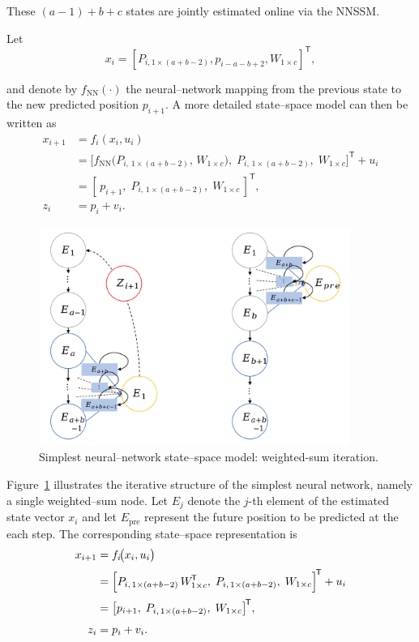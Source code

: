 \documentclass[sn-nature]{sn-jnl}%
\theoremstyle{thmstyleone}%
\theoremstyle{thmstyletwo}%
\theoremstyle{thmstylethree}%
\begin{document}
These \((a-1)+b+c\) states are jointly estimated online via the NNSSM.

Let
\noindent
\begin{equation}
{x_i} = {[P_{i,1 \times (a+b-2)},{p_{i-a-b+2}},{W_{1 \times c}}]^{\!\mathsf T}},
\label{3_3}
\end{equation}

and denote by \(f_{\mathrm{NN}}(\cdot)\) the neural–network mapping from the previous state to the new predicted position \(p_{i+1}\).  A more detailed state–space model can then be written as
\noindent
\begin{equation}
\begin{aligned}
x_{i+1} &= f_i(x_i,u_i) \\ 
        &= \bigl[f_{\mathrm{NN}}\bigl(P_{i,\,1\times(a+b-2)},\,W_{1\times c}\bigr),\;P_{i,\,1\times(a+b-2)},\;W_{1\times c}\bigr]^{\!\mathsf T}
           + u_i \\ 
        &= [\,p_{i+1},\;P_{i,\,1\times(a+b-2)},\;W_{1\times c}\,]^{\!\mathsf T},\\
z_i     &= p_i + v_i.
\end{aligned}
\label{eq:NNSSM_detailed}
\end{equation}


\begin{figure}[!t]
  \centering
  \includegraphics[width=4in]{fig/fig3_2.png}
  \caption{Simplest neural–network state–space model: weighted-sum iteration.}
  \label{fig:SNNSSM}
\end{figure}

Figure~\ref{fig:SNNSSM} illustrates the iterative structure of the simplest neural network, namely a single weighted–sum node.  Let \(E_j\) denote the \(j\)-th element of the estimated state vector \(x_i\) and let \(E_{\mathrm{pre}}\) represent the future position to be predicted at the each step.  The corresponding state–space representation is
\begin{equation}
\label{eq:NNSSM_simple}
\begin{aligned}
x_{i+1} &= f_i\!\bigl(x_i,u_i\bigr) \\[2pt]
        &= \Bigl[P_{i,\,1\times(a+b-2)}\,W_{1\times c}^{\!\mathsf T},\;
                 P_{i,\,1\times(a+b-2)},\;
                 W_{1\times c}\Bigr]^{\!\mathsf T}
           + u_i \\[2pt]
        &= \bigl[p_{i+1},\;P_{i,\,1\times(a+b-2)},\;W_{1\times c}\bigr]^{\!\mathsf T},\\[4pt]
z_i     &= p_i + v_i.
\end{aligned}
\end{equation}
\end{document}
